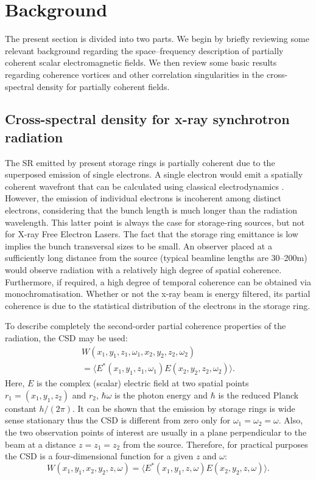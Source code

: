 \documentclass{iucr}              %
\begin{document}
\section{Background}

The present section is divided into two parts.  We begin by briefly reviewing some relevant background regarding the space--frequency description of partially coherent scalar electromagnetic fields.  We then review some basic results regarding coherence vortices and other correlation singularities in the cross-spectral density for partially coherent fields.  

\subsection{Cross-spectral density for x-ray synchrotron radiation}

The SR emitted by present storage rings is partially coherent due to the superposed emission of single electrons. A single electron would emit a spatially coherent wavefront that can be calculated using classical electrodynamics \cite{jackson}. However, the emission of individual electrons is incoherent among distinct electrons, considering that the bunch length is much longer than the radiation wavelength.  This latter point is always the case for storage-ring sources, but not for X-ray Free Electron Lasers. The fact that the storage ring emittance is low implies the bunch transversal sizes to be small. An observer placed at a sufficiently long distance from the source (typical beamline lengths are 30--200m) would observe  radiation with a relatively high degree of  spatial coherence. Furthermore, if required, a high degree of temporal coherence can be obtained via monochromatisation.  Whether or not the x-ray beam is energy filtered, its partial coherence is due to the statistical distribution of the electrons in the storage ring. 

To describe completely the second-order partial coherence properties of the radiation, the CSD \cite{Wolf1982,mandel_wolf} may be used: 
\begin{eqnarray}
\nonumber W(x_1,y_1,z_1,\omega_1,x_2,y_2,z_2,\omega_2) \quad\quad\quad\quad \\ = \langle E^{*}(x_1,y_1,z_1,\omega_1) E(x_2,y_2,z_2,\omega_2) \rangle.
\end{eqnarray}
Here, $E$ is the complex (scalar) electric field at two spatial points $r_1=(x_1,y_1,z_2)$ and $r_2$, $\hbar\omega$ is the photon energy and $\hbar$ is the reduced Planck constant $h/(2\pi)$. It can be shown that the emission by storage rings is wide sense stationary \cite{geloni} thus the CSD is different from zero only for $\omega_1=\omega_2=\omega$. Also, the two observation points of interest are usually in a plane perpendicular to the beam at a distance $z=z_1=z_2$ from the source. Therefore, for practical purposes the CSD is a four-dimensional function for a given $z$ and $\omega$: 
\begin{equation}
W(x_1,y_1,x_2,y_2,z,\omega) = 
\langle E^{*}(x_1,y_1,z,\omega) E(x_2,y_2,z,\omega)\rangle.
\end{equation}
\end{document}
